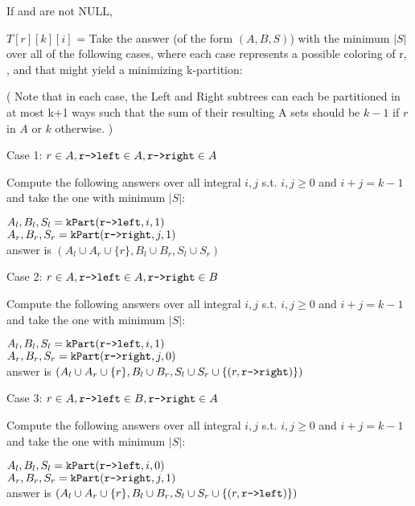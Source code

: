 \documentclass[11pt]{article}
\begin{document}
\begin{indentmore}
    If \rleft and \rright are not NULL,
        \begin{indentmore}
        $T[r][k][i]$ = Take the answer (of the form $(A,B,S)$) with the minimum $|S|$ over all of the following cases, where each case represents a possible coloring of r, \rright, and \rleft that might yield a minimizing k-partition:


          \begin{indentmore}
          ( Note that in each case, the Left and Right subtrees can each be partitioned in at most k+1 ways such that the sum of their resulting A sets should be $k-1$ if $r$ in $A$ or $k$ otherwise. )

          Case 1: $r \in A, \texttt{r->left} \in A, \texttt{r->right} \in A$
              \begin{indentmore}
              Compute the following answers over all integral $i,j$  s.t. $i,j \geq 0$ and $i+j = k-1$ and take the one with minimum $|S|$:
                \begin{indentmore}
                $A_l, B_l, S_l = \mathtt{kPart}(\texttt{r->left},i,1)$\\
                $A_r, B_r, S_r = \mathtt{kPart}(\texttt{r->right},j,1)$\\
                answer is $(A_l \cup A_r \cup \{r\},B_l \cup B_r,S_l \cup S_r)$
                \end{indentmore}
              \end{indentmore}

          Case 2: $r \in A, \texttt{r->left} \in A, \texttt{r->right} \in B$
              \begin{indentmore}
              Compute the following answers over all integral $i,j$  s.t. $i,j \geq 0$ and $i+j = k-1$ and take the one with minimum $|S|$:
                \begin{indentmore}
                $A_l, B_l, S_l = \mathtt{kPart}(\texttt{r->left},i,1)$\\
                $A_r, B_r, S_r = \mathtt{kPart}(\texttt{r->right},j,0)$\\
                answer is $(A_l \cup A_r \cup \{r\},B_l \cup B_r,S_l \cup S_r \cup \{(r, \texttt{r->right})\})$
                \end{indentmore}
              \end{indentmore}

          Case 3: $r \in A, \texttt{r->left} \in B, \texttt{r->right} \in A$
              \begin{indentmore}
              Compute the following answers over all integral $i,j$  s.t. $i,j \geq 0$ and $i+j = k-1$ and take the one with minimum $|S|$:
                \begin{indentmore}
                $A_l, B_l, S_l = \mathtt{kPart}(\texttt{r->left},i,0)$\\
                $A_r, B_r, S_r = \mathtt{kPart}(\texttt{r->right},j,1)$\\
                answer is $(A_l \cup A_r \cup \{r\},B_l \cup B_r,S_l \cup S_r \cup \{(r, \texttt{r->left})\})$
                \end{indentmore}
              \end{indentmore}


\end{indentmore}
\end{indentmore}
\end{indentmore}
\end{document}
